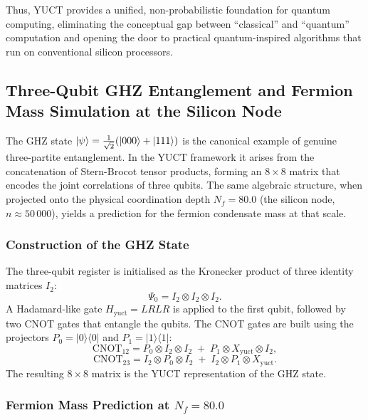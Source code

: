 \documentclass[12pt,a4paper]{article}
\begin{document}
	Thus, YUCT provides a unified, non-probabilistic foundation for quantum computing, eliminating the conceptual gap between ``classical'' and ``quantum'' computation and opening the door to practical quantum-inspired algorithms that run on conventional silicon processors.
	
	\subsection{Three-Qubit GHZ Entanglement and Fermion Mass Simulation at the Silicon Node}
	
	The GHZ state $\ket{\psi} = \frac{1}{\sqrt{2}}(\ket{000} + \ket{111})$ is the
	canonical example of genuine three-partite entanglement.  In the YUCT
	framework it arises from the concatenation of Stern-Brocot tensor products,
	forming an $8\times 8$ matrix that encodes the joint correlations of three
	qubits.  The same algebraic structure, when projected onto the physical
	coordination depth $N_f = 80.0$ (the silicon node, $n \approx 50\,000$),
	yields a prediction for the fermion condensate mass at that scale.
	
	\subsubsection{Construction of the GHZ State}
	
	The three-qubit register is initialised as the Kronecker product of three
	identity matrices $I_2$:
	\[
	\Psi_0 = I_2 \otimes I_2 \otimes I_2 .
	\]
	A Hadamard-like gate $H_{\text{yuct}} = LRLR$ is applied to the first qubit,
	followed by two CNOT gates that entangle the qubits.  The CNOT gates are
	built using the projectors $P_0 = |0\rangle\langle0|$ and $P_1 = |1\rangle\langle1|$:
	\[
	\mathrm{CNOT}_{12} = P_0 \otimes I_2 \otimes I_2 \;+\; P_1 \otimes X_{\text{yuct}} \otimes I_2 ,
	\]
	\[
	\mathrm{CNOT}_{23} = I_2 \otimes P_0 \otimes I_2 \;+\; I_2 \otimes P_1 \otimes X_{\text{yuct}} .
	\]
	The resulting $8\times 8$ matrix is the YUCT representation of the GHZ
	state.
	
	\subsubsection{Fermion Mass Prediction at $N_f = 80.0$}
	
\end{document}
